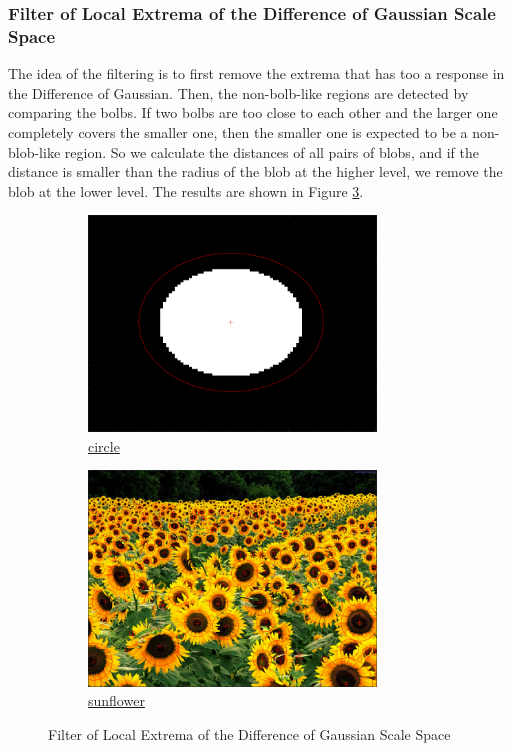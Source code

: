 \subsubsection{Filter of Local Extrema of the Difference of Gaussian Scale Space}
The idea of the filtering is to first remove the extrema that has too a response in the Difference of Gaussian.
Then, the non-bolb-like regions are detected by comparing the bolbs.
If two bolbs are too close to each other and the larger one completely covers the smaller one, then the smaller one is expected to be a non-blob-like region.
So we calculate the distances of all pairs of blobs, and if the distance is smaller than the radius of the blob at the higher level, we remove the blob at the lower level.
The results are shown in Figure \ref{fig:14}.
\begin{figure}
	\centering
	\begin{subfigure}[t]{\textwidth}
	    \centering
		\includegraphics[width=0.84\textwidth]{hw3/problem1/filterc.png}
		\caption{\href{./hw3/problem1/filterc.png}{circle}}\label{fig:14a}
	\end{subfigure}
	\begin{subfigure}[t]{\textwidth}
	    \centering
		\includegraphics[width=0.84\textwidth]{hw3/problem1/filters.png}
		\caption{\href{./hw3/problem1/filters.png}{sunflower}}\label{fig:14b}
	\end{subfigure}
	\caption{Filter of Local Extrema of the Difference of Gaussian Scale Space}\label{fig:14}
\end{figure}


